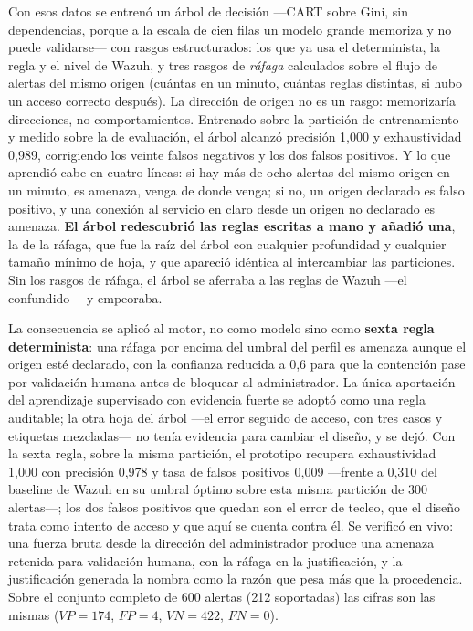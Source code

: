 Con esos datos se entrenó un árbol de decisión ---CART sobre Gini, sin dependencias, porque a la
escala de cien filas un modelo grande memoriza y no puede validarse--- con rasgos estructurados:
los que ya usa el determinista, la regla y el nivel de Wazuh, y tres rasgos de \emph{ráfaga}
calculados sobre el flujo de alertas del mismo origen (cuántas en un minuto, cuántas reglas
distintas, si hubo un acceso correcto después). La dirección de origen no es un rasgo: memorizaría
direcciones, no comportamientos. Entrenado sobre la partición de entrenamiento y medido sobre la
de evaluación, el árbol alcanzó precisión 1,000 y exhaustividad 0,989, corrigiendo los veinte
falsos negativos y los dos falsos positivos. Y lo que aprendió cabe en cuatro líneas: si hay más
de ocho alertas del mismo origen en un minuto, es amenaza, venga de donde venga; si no, un origen
declarado es falso positivo, y una conexión al servicio en claro desde un origen no declarado es
amenaza. \textbf{El árbol redescubrió las reglas escritas a mano y añadió una}, la de la ráfaga,
que fue la raíz del árbol con cualquier profundidad y cualquier tamaño mínimo de hoja, y que
apareció idéntica al intercambiar las particiones. Sin los rasgos de ráfaga, el árbol se aferraba
a las reglas de Wazuh ---el confundido--- y empeoraba.

La consecuencia se aplicó al motor, no como modelo sino como \textbf{sexta regla determinista}:
una ráfaga por encima del umbral del perfil es amenaza aunque el origen esté declarado, con la
confianza reducida a 0,6 para que la contención pase por validación humana antes de bloquear al
administrador. La única aportación del aprendizaje supervisado con evidencia fuerte se adoptó como
una regla auditable; la otra hoja del árbol ---el error seguido de acceso, con tres casos y
etiquetas mezcladas--- no tenía evidencia para cambiar el diseño, y se dejó. Con la sexta regla,
sobre la misma partición, el prototipo recupera exhaustividad 1,000 con precisión 0,978 y tasa de
falsos positivos 0,009 ---frente a 0,310 del baseline de Wazuh en su umbral óptimo sobre esta misma
partición de 300 alertas---; los dos falsos positivos que quedan son el error de tecleo, que el diseño
trata como intento de acceso y que aquí se cuenta contra él. Se verificó en vivo: una fuerza bruta
desde la dirección del administrador produce una amenaza retenida para validación humana, con la
ráfaga en la justificación, y la justificación generada la nombra como la razón que pesa más que
la procedencia. Sobre el conjunto completo de 600 alertas (212 soportadas) las cifras son las
mismas ($VP=174$, $FP=4$, $VN=422$, $FN=0$).


